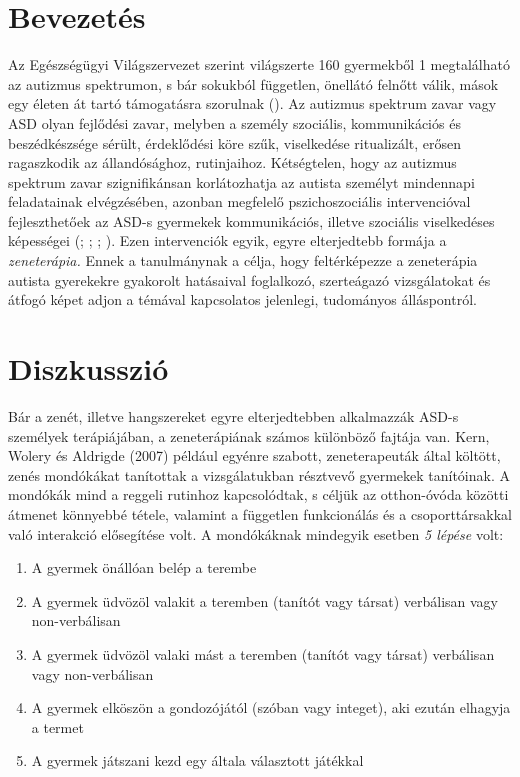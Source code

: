 \section*{Bevezetés}

Az Egészségügyi Világszervezet szerint világ\-szerte 160 gyermekből 1 megtalálható az autizmus spektrumon, s bár sokukból független, önellátó felnőtt válik, mások egy életen át tartó támogatásra szorulnak (\cite{WHO}). Az autizmus spektrum zavar vagy ASD olyan fejlődési zavar, melyben a személy szociális, kommunikációs és beszédkészsége sérült, érdeklődési köre szűk, viselkedése ritualizált, erősen ragaszkodik az állandósághoz, rutinjaihoz. Kétségtelen, hogy az autizmus spektrum zavar szignifikánsan korlátozhatja az autista személyt mindennapi feladatainak elvégzésé\-ben, azonban megfelelő pszichoszociális intervencióval fejleszthetőek az ASD-s gyermekek kommunikációs, illetve szociális viselkedéses képességei (\textcite{boso_emanuele_minazzi_abbamonte_politi_2007}; \textcite{finnigan_starr_2010}; \textcite{kern_wolery_aldridge_2006}; \textcite{kim_wigram_gold_2009}). Ezen intervenciók egyik, egyre elterjedtebb formája a \textit{zeneterápia.} Ennek a tanulmánynak a célja, hogy feltérképezze a zeneterápia autista gyerekekre gyakorolt hatásaival foglalkozó, szerteágazó vizsgá\-latokat és átfogó képet adjon a témával kapcsolatos jelenlegi, tudományos álláspontról.
\pagebreak
\section*{Diszkusszió}

Bár a zenét, illetve hangszereket egyre elterjedtebben alkalmazzák ASD-s személyek terápiájában, a zeneterápiának számos különböző fajtája van. Kern, Wolery és Aldrigde (2007) például egyénre szabott, zeneterapeuták által költött, zenés mondóká\-kat tanítottak a vizsgálatukban résztvevő gyermekek tanítóinak. A mondókák mind a reggeli rutinhoz kapcsolódtak, s céljük az otthon-óvóda közötti átmenet könnyebbé tétele, valamint a független funkcionálás és a csoporttársakkal való interakció elősegí\-tése volt. A mondó\-káknak mindegyik esetben \textit{5 lépése} volt:

\begin{enumerate}
	\item A gyermek önállóan belép a terembe
	
	\item A gyermek üdvözöl valakit a teremben (tanítót vagy társat) verbálisan vagy non-verbálisan
	
	\item A gyermek üdvözöl valaki mást a teremben (tanítót vagy társat) verbálisan vagy non-verbálisan
	
	\item A gyermek elköszön a gondozójától (szóban vagy integet), aki ezután elhagyja a termet
	
	\item A gyermek játszani kezd egy általa választott játékkal
\end{enumerate}

